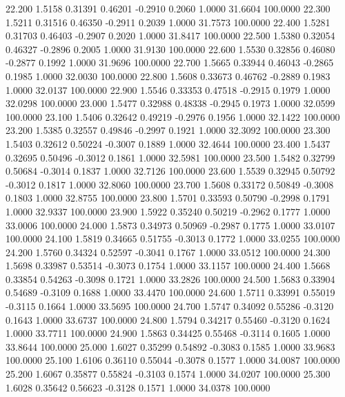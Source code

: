   22.200   1.5158   0.31391   0.46201  -0.2910   0.2060   1.0000  31.6604 100.0000
  22.300   1.5211   0.31516   0.46350  -0.2911   0.2039   1.0000  31.7573 100.0000
  22.400   1.5281   0.31703   0.46403  -0.2907   0.2020   1.0000  31.8417 100.0000
  22.500   1.5380   0.32054   0.46327  -0.2896   0.2005   1.0000  31.9130 100.0000
  22.600   1.5530   0.32856   0.46080  -0.2877   0.1992   1.0000  31.9696 100.0000
  22.700   1.5665   0.33944   0.46043  -0.2865   0.1985   1.0000  32.0030 100.0000
  22.800   1.5608   0.33673   0.46762  -0.2889   0.1983   1.0000  32.0137 100.0000
  22.900   1.5546   0.33353   0.47518  -0.2915   0.1979   1.0000  32.0298 100.0000
  23.000   1.5477   0.32988   0.48338  -0.2945   0.1973   1.0000  32.0599 100.0000
  23.100   1.5406   0.32642   0.49219  -0.2976   0.1956   1.0000  32.1422 100.0000
  23.200   1.5385   0.32557   0.49846  -0.2997   0.1921   1.0000  32.3092 100.0000
  23.300   1.5403   0.32612   0.50224  -0.3007   0.1889   1.0000  32.4644 100.0000
  23.400   1.5437   0.32695   0.50496  -0.3012   0.1861   1.0000  32.5981 100.0000
  23.500   1.5482   0.32799   0.50684  -0.3014   0.1837   1.0000  32.7126 100.0000
  23.600   1.5539   0.32945   0.50792  -0.3012   0.1817   1.0000  32.8060 100.0000
  23.700   1.5608   0.33172   0.50849  -0.3008   0.1803   1.0000  32.8755 100.0000
  23.800   1.5701   0.33593   0.50790  -0.2998   0.1791   1.0000  32.9337 100.0000
  23.900   1.5922   0.35240   0.50219  -0.2962   0.1777   1.0000  33.0006 100.0000
  24.000   1.5873   0.34973   0.50969  -0.2987   0.1775   1.0000  33.0107 100.0000
  24.100   1.5819   0.34665   0.51755  -0.3013   0.1772   1.0000  33.0255 100.0000
  24.200   1.5760   0.34324   0.52597  -0.3041   0.1767   1.0000  33.0512 100.0000
  24.300   1.5698   0.33987   0.53514  -0.3073   0.1754   1.0000  33.1157 100.0000
  24.400   1.5668   0.33854   0.54263  -0.3098   0.1721   1.0000  33.2826 100.0000
  24.500   1.5683   0.33904   0.54689  -0.3109   0.1688   1.0000  33.4470 100.0000
  24.600   1.5711   0.33991   0.55019  -0.3115   0.1664   1.0000  33.5695 100.0000
  24.700   1.5747   0.34092   0.55286  -0.3120   0.1643   1.0000  33.6737 100.0000
  24.800   1.5794   0.34217   0.55460  -0.3120   0.1624   1.0000  33.7711 100.0000
  24.900   1.5863   0.34425   0.55468  -0.3114   0.1605   1.0000  33.8644 100.0000
  25.000   1.6027   0.35299   0.54892  -0.3083   0.1585   1.0000  33.9683 100.0000
  25.100   1.6106   0.36110   0.55044  -0.3078   0.1577   1.0000  34.0087 100.0000
  25.200   1.6067   0.35877   0.55824  -0.3103   0.1574   1.0000  34.0207 100.0000
  25.300   1.6028   0.35642   0.56623  -0.3128   0.1571   1.0000  34.0378 100.0000
